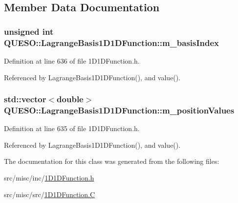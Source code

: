 \subsection{Member Data Documentation}
\hypertarget{class_q_u_e_s_o_1_1_lagrange_basis1_d1_d_function_a60019a66c1e61dd099917d84e8165d81}{
\subsubsection[{m\-\_\-basis\-Index}]{\setlength{\rightskip}{0pt plus 5cm}unsigned int Q\-U\-E\-S\-O\-::\-Lagrange\-Basis1\-D1\-D\-Function\-::m\-\_\-basis\-Index\hspace{0.3cm}{\ttfamily [protected]}}}\label{class_q_u_e_s_o_1_1_lagrange_basis1_d1_d_function_a60019a66c1e61dd099917d84e8165d81}


Definition at line 636 of file 1\-D1\-D\-Function.\-h.



Referenced by Lagrange\-Basis1\-D1\-D\-Function(), and value().

\hypertarget{class_q_u_e_s_o_1_1_lagrange_basis1_d1_d_function_a77fa2b4b50c630ed258c9b99b9ac056f}{
\subsubsection[{m\-\_\-position\-Values}]{\setlength{\rightskip}{0pt plus 5cm}std\-::vector$<$double$>$ Q\-U\-E\-S\-O\-::\-Lagrange\-Basis1\-D1\-D\-Function\-::m\-\_\-position\-Values\hspace{0.3cm}{\ttfamily [protected]}}}\label{class_q_u_e_s_o_1_1_lagrange_basis1_d1_d_function_a77fa2b4b50c630ed258c9b99b9ac056f}


Definition at line 635 of file 1\-D1\-D\-Function.\-h.



Referenced by Lagrange\-Basis1\-D1\-D\-Function(), and value().



The documentation for this class was generated from the following files\-:\begin{DoxyCompactItemize}
\item 
src/misc/inc/\hyperlink{1_d1_d_function_8h}{1\-D1\-D\-Function.\-h}\item 
src/misc/src/\hyperlink{1_d1_d_function_8_c}{1\-D1\-D\-Function.\-C}\end{DoxyCompactItemize}
